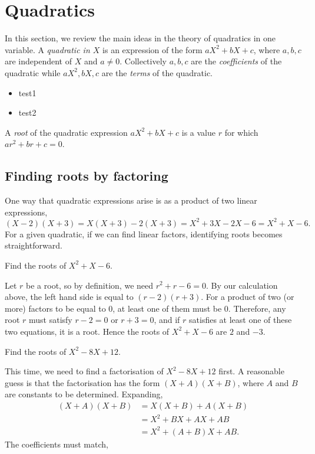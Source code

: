 \section{Quadratics}

In this section, we review the main ideas in the theory of quadratics in one variable. A \emph{quadratic in $X$} is an expression of the form $aX^2 + bX + c$, where $a,b,c$ are independent of $X$ and $a\neq 0$. Collectively $a,b,c$ are the \emph{coefficients} of the quadratic while $aX^2, bX, c$ are the \emph{terms} of the quadratic.
\begin{itemize}
\item test1
\item test2
\end{itemize}
A \emph{root} of the quadratic expression $aX^2 + bX + c$ is a value $r$ for which $ar^2 + br + c = 0$.

\subsection{Finding roots by factoring}

One way that quadratic expressions arise is as a product of two linear expressions,
\begin{equation*}
(X - 2)(X + 3) = X(X + 3) - 2(X + 3) = X^2 + 3X - 2X - 6 = X^2 + X - 6. 
\end{equation*}
For a given quadratic, if we can find linear factors, identifying roots becomes straightforward.

\begin{example}
Find the roots of $X^2 + X - 6$. 
\end{example}
\begin{solution}
Let $r$ be a root, so by definition, we need $r^2 + r - 6 = 0$. By our calculation above, the left hand side is equal to $(r - 2)(r + 3)$. For a product of two (or more) factors to be equal to $0$, at least one of them must be $0$. Therefore, any root $r$ must satisfy $r - 2 = 0$ or $r + 3 = 0$, and if $r$ satisfies at least one of these two equations, it is a root. Hence the roots of $X^2 + X - 6$ are $2$ and $-3$.
\end{solution}

\begin{example}
Find the roots of $X^2 - 8X + 12$.
\end{example}
\begin{solution}
This time, we need to find a factorisation of $X^2 - 8X + 12$ first. A reasonable guess is that the factorisation has the form $(X + A)(X + B)$, where $A$ and $B$ are constants to be determined. Expanding,
\begin{align*}
(X + A)(X + B) &= X(X + B) + A(X + B) \\
&= X^2 + BX + AX + AB \\
&= X^2 + (A + B)X + AB.
\end{align*}
The coefficients must match, 
\end{solution}